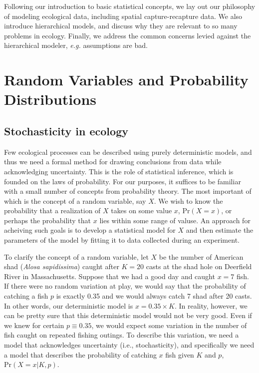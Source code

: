 Following our introduction to basic statistical concepts, we lay out our
philosophy of modeling ecological data, including spatial
capture-recapture data. We also introduce hierarchical
models, and discuss why they are relevant to so many problems in
ecology. Finally, we address the common concerns levied against the
hierarchical modeler, \emph{e.g.} assumptions are bad.

\section{Random Variables and Probability Distributions}

\subsection{Stochasticity in ecology}

Few ecological processes can be described using purely deterministic
models, and thus we need a formal method for drawing conclusions from data while
acknowledging uncertainty. This is the role of statistical inference,
which is founded on the laws of probability. For our purposes, it
suffices to be familiar with a small number of concepts from
probability theory. The most important of which is the concept of a random
variable, say $X$. We wish to know the probability that a realization
of $X$ takes on some value $x$, %
$\text{Pr}(X=x)$, or perhaps the probability that $x$ lies within some
range of valuse. An approach for acheiving such goals is to develop a
statistical model for $X$ and then estimate the parameters of the
model by fitting it to data collected during an experiment.

To clarify the concept of a random variable, let $X$ be the number of
American shad (\emph{Alosa sapidissima}) caught after $K=20$ casts at
the shad hole on Deerfield River in Massachusetts. Suppose that
we had a good day and caught $x=7$ fish. If there were no random
variation at play, we would say that the probability of catching a
fish $p$ is exactly 0.35 and we would always catch 7 shad after 20
casts. In other words, our deterministic model is $x =
0.35\times K$. In reality, however, we can be pretty sure that this
deterministic model would not be very good. Even if we knew for
certain $p \equiv 0.35$, we would expect some variation in the number
of fish caught on repeated fishing outings. To describe this
variation, we need a model that acknowledges uncertainty (i.e.,
stochasticity), and specifically we need a model that describes the
probability of catching $x$ fish given $K$ and $p$,
$\text{Pr}(X=x|K,p)$.

